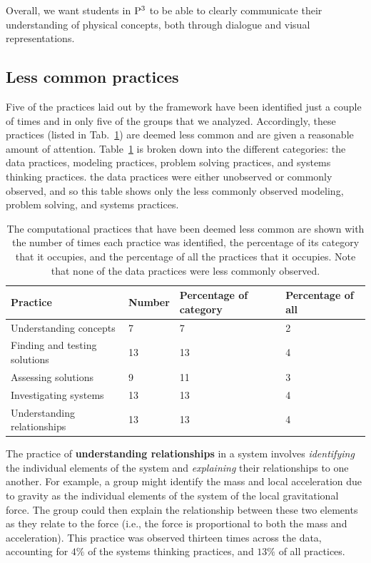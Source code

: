 \documentclass{msuphddissertation}
\begin{document}
\begin{doublespace}
Overall, we want students in ${\rm P}^{3}$ to be able to clearly communicate their understanding of physical concepts, both through dialogue and visual representations.

%
%
%
%
%
%
%
%
%
%
%
%
%
%
%
%

\subsection{Less common practices}

Five of the practices laid out by the framework have been identified just a couple of times and in only five of the groups that we analyzed.  Accordingly, these practices (listed in Tab.~\ref{CH6:LessCommon}) are deemed less common and are given a reasonable amount of attention.  Table~\ref{CH6:LessCommon} is broken down into the different categories: the data practices, modeling practices, problem solving practices, and systems thinking practices.  the data practices were either unobserved or commonly observed, and so this table shows only the less commonly observed modeling, problem solving, and systems practices.

\begin{table}[ht]\centering
\begin{tabular}{llll}\hline\hline
Practice & Number & Percentage of category & Percentage of all \\\hline
Understanding concepts & 7 & 7 & 2 \\
Finding and testing solutions & 13 & 13 & 4 \\\hline
Assessing solutions & 9 & 11 & 3 \\\hline
Investigating systems & 13 & 13 & 4 \\
Understanding relationships & 13 & 13 & 4 \\\hline\hline
\end{tabular}
\caption{The computational practices that have been deemed less common are shown with the number of times each practice was identified, the percentage of its category that it occupies, and the percentage of all the practices that it occupies.  Note that none of the data practices were less commonly observed.}\label{CH6:LessCommon}
\end{table}

The practice of \textbf{understanding relationships} in a system involves \textit{identifying} the individual elements of the system and \textit{explaining} their relationships to one another.  For example, a group might identify the mass and local acceleration due to gravity as the individual elements of the system of the local gravitational force.  The group could then explain the relationship between these two elements as they relate to the force (i.e., the force is proportional to both the mass and acceleration).  This practice was observed thirteen times across the data, accounting for $4\%$ of the systems thinking practices, and $13\%$ of all practices.


\end{doublespace}
\end{document}
